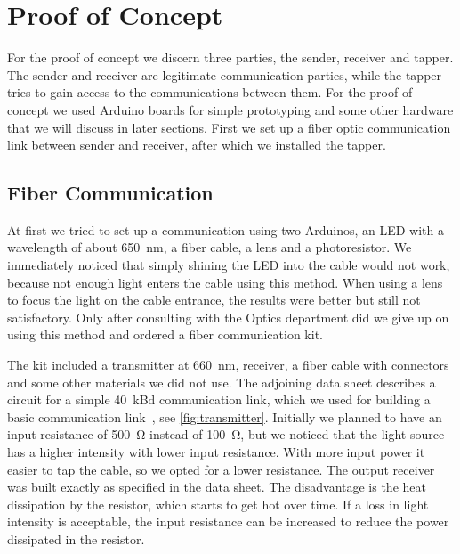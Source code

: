 \documentclass[11pt,twoside,a4paper]{scrartcl}
\begin{document}
\section{Proof of Concept}
	For the proof of concept we discern three parties, the sender, receiver and tapper.
	The sender and receiver are legitimate communication parties,
	while the tapper tries to gain access to the communications between them.
	For the proof of concept we used Arduino boards for simple prototyping and some other hardware
	that we will discuss in later sections.
	First we set up a fiber optic communication link between sender and receiver,
	after which we installed the tapper.

	\subsection{Fiber Communication}
		At first we tried to set up a communication using two Arduinos, an LED with a wavelength of about \SI{650}{\nano\meter},
		a fiber cable, a lens and a photoresistor.
		We immediately noticed that simply shining the LED into the cable would not work,
		because not enough light enters the cable using this method.
		When using a lens to focus the light on the cable entrance,
		the results were better but still not satisfactory.
		Only after consulting with the Optics department did we give up on using this method
		and ordered a fiber communication kit.

		The kit included a transmitter at \SI{660}{\nano\meter}, receiver, a fiber cable with connectors and some other materials we did not use.
		The adjoining data sheet describes a circuit for a simple \SI{40}{\kilo Bd} communication link,
		which we used for building a basic communication link~\cite[p.15]{avagokit},
		see \cref{fig:transmitter}.
		Initially we planned to have an input resistance of \SI{500}{\ohm} instead of \SI{100}{\ohm},
		but we noticed that the light source has a higher intensity with lower input resistance.
		With more input power it easier to tap the cable, so we opted for a lower resistance.
		The output receiver was built exactly as specified in the data sheet.
		The disadvantage is the heat dissipation by the resistor, which starts to get hot over time.
		If a loss in light intensity is acceptable,
		the input resistance can be increased to reduce the power dissipated in the resistor.
\end{document}
